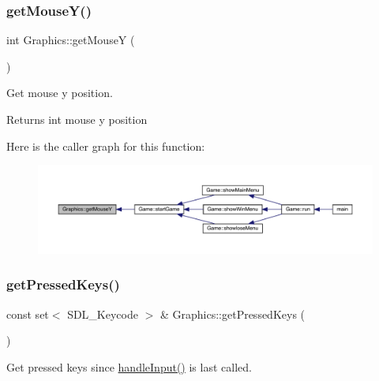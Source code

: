 \subsubsection{\texorpdfstring{get\+Mouse\+Y()}{getMouseY()}}
{\footnotesize\ttfamily int Graphics\+::get\+MouseY (\begin{DoxyParamCaption}{ }\end{DoxyParamCaption})}



Get mouse y position. 

\begin{DoxyReturn}{Returns}
int mouse y position 
\end{DoxyReturn}
Here is the caller graph for this function\+:
\nopagebreak
\begin{figure}[H]
\begin{center}
\leavevmode
\includegraphics[width=350pt]{class_graphics_a4e21e1cfcd4523e86ddbc9c5d246de1e_icgraph}
\end{center}
\end{figure}
\mbox{\label{class_graphics_a772ed930cc5ae22dcdc35b4094bffbce}} 
\subsubsection{\texorpdfstring{get\+Pressed\+Keys()}{getPressedKeys()}}
{\footnotesize\ttfamily const set$<$ S\+D\+L\+\_\+\+Keycode $>$ \& Graphics\+::get\+Pressed\+Keys (\begin{DoxyParamCaption}{ }\end{DoxyParamCaption})}



Get pressed keys since \mbox{\hyperlink{class_graphics_adff993cdcd0ed498c82cf7be87ead4f1}{handle\+Input()}} is last called. 

